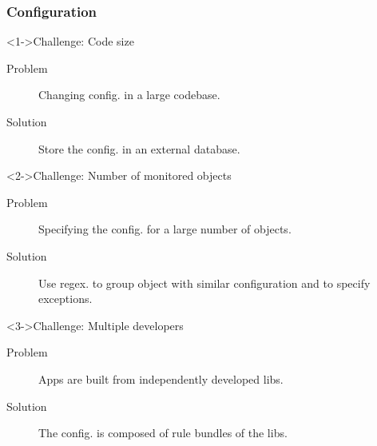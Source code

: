 \documentclass[]{prezentare}
\begin{document}

\begin{frame}
	\frametitle{Configuration}
	\begin{block}<1->{Challenge: Code size}
	\begin{description}
	\item [Problem]	Changing config. in a large codebase.
	\item [Solution] Store the config. in an external database.
	\end{description}
	\end{block}
	
	\begin{block}<2->{Challenge: Number of monitored objects}
	\begin{description}
	\item [Problem] Specifying the config. for a large number of objects.
	\item [Solution] Use regex. to group object with similar configuration and to specify exceptions.
	\end{description}
	\end{block}
	
	\begin{block}<3->{Challenge: Multiple developers}
	\begin{description}
	\item [Problem] Apps are built from independently developed libs.
	\item [Solution] The config. is composed of rule bundles of the libs.
	\end{description}
	\end{block}
\end{frame}

\end{document}
